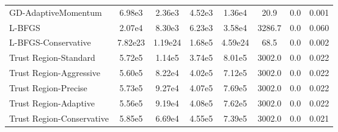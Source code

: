 \documentclass{article}
\begin{document}
\begin{table}[htbp]
{\begin{tabular}{p{2.5cm}*{7}{c}}
GD-AdaptiveMomentum & 6.98e3 & 2.36e3 & 4.52e3 & 1.36e4 & 20.9 & 0.0 & 0.001 \\
L-BFGS & 2.07e4 & 8.30e3 & 6.23e3 & 3.58e4 & 3286.7 & 0.0 & 0.060 \\
L-BFGS-Conservative & 7.82e23 & 1.19e24 & 1.68e5 & 4.59e24 & 68.5 & 0.0 & 0.002 \\
Trust Region-Standard & 5.72e5 & 1.14e5 & 3.74e5 & 8.01e5 & 3002.0 & 0.0 & 0.022 \\
Trust Region-Aggressive & 5.60e5 & 8.22e4 & 4.02e5 & 7.12e5 & 3002.0 & 0.0 & 0.022 \\
Trust Region-Precise & 5.73e5 & 9.27e4 & 4.07e5 & 7.69e5 & 3002.0 & 0.0 & 0.022 \\
Trust Region-Adaptive & 5.56e5 & 9.19e4 & 4.08e5 & 7.62e5 & 3002.0 & 0.0 & 0.022 \\
Trust Region-Conservative & 5.85e5 & 6.69e4 & 4.55e5 & 7.39e5 & 3002.0 & 0.0 & 0.021 \\
\bottomrule
\end{tabular}
}
\end{table}
\end{document}
